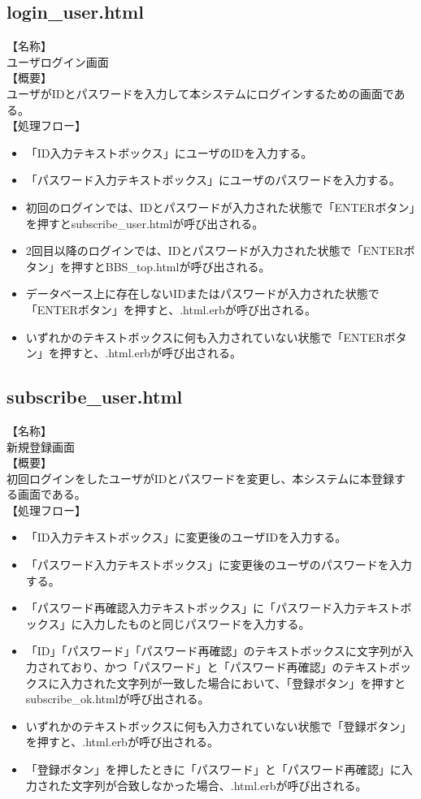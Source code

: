 \documentclass[a4j]{jarticle}
\begin{document}
\subsection{login\_user.html}
【名称】\\
ユーザログイン画面\\
【概要】\\
ユーザがIDとパスワードを入力して本システムにログインするための画面である。\\
【処理フロー】\\
\begin{itemize}
  \item 「ID入力テキストボックス」にユーザのIDを入力する。
  \item 「パスワード入力テキストボックス」にユーザのパスワードを入力する。
  \item 初回のログインでは、IDとパスワードが入力された状態で「ENTERボタン」を押すとsubscribe\_user.htmlが呼び出される。
  \item 2回目以降のログインでは、IDとパスワードが入力された状態で「ENTERボタン」を押すとBBS\_top.htmlが呼び出される。
  \item データベース上に存在しないIDまたはパスワードが入力された状態で「ENTERボタン」を押すと、.html.erbが呼び出される。
  \item いずれかのテキストボックスに何も入力されていない状態で「ENTERボタン」を押すと、.html.erbが呼び出される。
\end{itemize}


\subsection{subscribe\_user.html}
【名称】\\
新規登録画面\\
【概要】\\
初回ログインをしたユーザがIDとパスワードを変更し、本システムに本登録する画面である。\\
【処理フロー】\\
\begin{itemize}
  \item 「ID入力テキストボックス」に変更後のユーザIDを入力する。
  \item 「パスワード入力テキストボックス」に変更後のユーザのパスワードを入力する。
  \item 「パスワード再確認入力テキストボックス」に「パスワード入力テキストボックス」に入力したものと同じパスワードを入力する。
  \item 「ID」「パスワード」「パスワード再確認」のテキストボックスに文字列が入力されており、かつ「パスワード」と「パスワード再確認」のテキストボックスに入力された文字列が一致した場合において、「登録ボタン」を押すとsubscribe\_ok.htmlが呼び出される。
  \item いずれかのテキストボックスに何も入力されていない状態で「登録ボタン」を押すと、.html.erbが呼び出される。
  \item 「登録ボタン」を押したときに「パスワード」と「パスワード再確認」に入力された文字列が合致しなかった場合、.html.erbが呼び出される。
\end{itemize}
\end{document}

